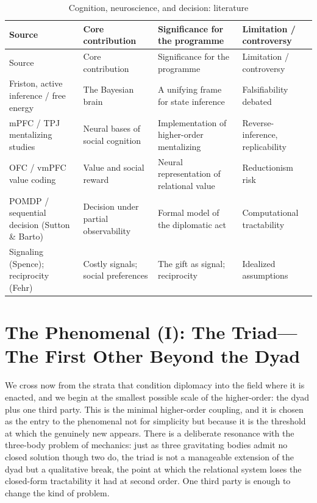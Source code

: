 \goldrule
\footnotesize
\begin{longtable}{Y Y Y Y}
\caption{Cognition, neuroscience, and decision: literature}\label{p07:tab:neuro}\\
\toprule
{}
Source & Core contribution & Significance for the programme & Limitation / controversy \\
\midrule
\endfirsthead
\toprule
{}
Source & Core contribution & Significance for the programme & Limitation / controversy \\
\midrule
\endhead
Friston, active inference / free energy & The Bayesian brain & A unifying frame for state inference & Falsifiability debated \\
mPFC / TPJ mentalizing studies & Neural bases of social cognition & Implementation of higher-order mentalizing & Reverse-inference, replicability \\
OFC / vmPFC value coding & Value and social reward & Neural representation of relational value & Reductionism risk \\
POMDP / sequential decision (Sutton \& Barto) & Decision under partial observability & Formal model of the diplomatic act & Computational tractability \\
Signaling (Spence); reciprocity (Fehr) & Costly signals; social preferences & The gift as signal; reciprocity & Idealized assumptions \\
\bottomrule
\end{longtable}

\section{The Phenomenal (I): The Triad---The First Other Beyond the Dyad}\label{p07:sec:triad}

We cross now from the strata that condition diplomacy into the field where it is enacted, and we begin at the smallest possible scale of the higher-order: the dyad plus one third party. This is the minimal higher-order coupling, and it is chosen as the entry to the phenomenal not for simplicity but because it is the threshold at which the genuinely new appears. There is a deliberate resonance with the three-body problem of mechanics: just as three gravitating bodies admit no closed solution though two do, the triad is not a manageable extension of the dyad but a qualitative break, the point at which the relational system loses the closed-form tractability it had at second order. One third party is enough to change the kind of problem.

